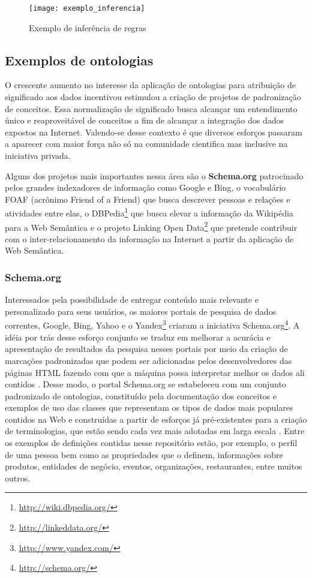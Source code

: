 \begin{figure}[!ht]
  \centering
  \texttt{[image: exemplo\_inferencia]} 
  \caption{Exemplo de inferência de regras}
  \label{fig:exemplo_inferencia} 
\end{figure}

\subsection{Exemplos de ontologias}
\label{sec:projetos_de_ontologias}

O crescente aumento no interesse da aplicação de ontologias para atribuição de significado aos dados incentivou estimulou a criação de projetos de padronização de conceitos. Essa normalização de significado busca alcançar um entendimento único e reaproveitável de conceitos a fim de  alcançar a integração dos dados expostos na Internet. Valendo-se desse contexto é que diversos esforços passaram a aparecer com maior força não só na comunidade cientifica mas inclusive na iniciativa privada.

Alguns dos projetos mais importantes nessa área são o \textbf{Schema.org} patrocinado pelos grandes indexadores de informação como Google e Bing, o vocabulário FOAF \citep{Brickley2010} (acrônimo Friend of a Friend) que busca descrever pessoas e relações e atividades entre elas, o DBPedia\footnote{\url{http://wiki.dbpedia.org/}} que busca elevar a informação da Wikipédia para a Web Semântica e o projeto Linking Open Data\footnote{\url{http://linkeddata.org/}} que pretende contribuir com o inter-relacionamento da informação na Internet a partir da aplicação de Web Semântica.

\subsubsection{Schema.org}
\label{sec:schema_org}
Interessados pela possibilidade de entregar conteúdo mais relevante e personalizado para seus usuários, os maiores portais de pesquisa de dados correntes, Google, Bing, Yahoo e o Yandex\footnote{\url{http://www.yandex.com/}} criaram a iniciativa Schema.org\footnote{\url{http://schema.org/}}. A idéia por trás desse esforço conjunto se traduz em melhorar a acurácia e apresentação de resultados da pesquisa nesses portais por meio da criação de marcações padronizadas que podem ser adicionadas pelos desenvolvedores das páginas HTML fazendo com que a máquina possa interpretar melhor os dados ali contidos \citep{Tort2014, Mika2015}. Desse modo, o portal Schema.org se estabeleceu com um conjunto padronizado de ontologias, constituído pela documentação dos conceitos e exemplos de uso das classes que representam os tipos de dados mais populares contidos na Web e construídas a partir de esforços já pré-existentes para a criação de terminologias, que estão sendo cada vez mais adotadas em larga escala \citep{Mika2015}. Entre os exemplos de definições contidas nesse repositório estão, por exemplo, o perfil de uma pessoa bem como as propriedades que o definem, informações sobre produtos, entidades de negócio, eventos, organizações, restaurantes, entre muitos outros. 

